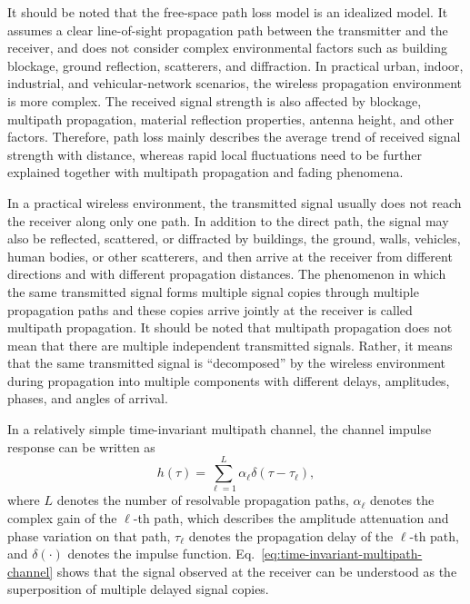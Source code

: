It should be noted that the free-space path loss model is an idealized model.
It assumes a clear line-of-sight propagation path between the transmitter and the receiver,
and does not consider complex environmental factors such as building blockage,
ground reflection,
scatterers,
and diffraction.
In practical urban,
indoor,
industrial,
and vehicular-network scenarios,
the wireless propagation environment is more complex.
The received signal strength is also affected by blockage,
multipath propagation,
material reflection properties,
antenna height,
and other factors.
Therefore,
path loss mainly describes the average trend of received signal strength with distance,
whereas rapid local fluctuations need to be further explained together with multipath propagation
and fading phenomena.


In a practical wireless environment,
the transmitted signal usually does not reach the receiver along only one path.
In addition to the direct path,
the signal may also be reflected,
scattered,
or diffracted by buildings,
the ground,
walls,
vehicles,
human bodies,
or other scatterers,
and then arrive at the receiver from different directions and with different propagation distances.
The phenomenon in which the same transmitted signal forms multiple signal copies through multiple propagation paths
and these copies arrive jointly at the receiver is called multipath propagation.
It should be noted that multipath propagation does not mean that there are multiple independent transmitted signals.
Rather,
it means that the same transmitted signal is ``decomposed'' by the wireless environment during propagation
into multiple components with different delays,
amplitudes,
phases,
and angles of arrival.

In a relatively simple time-invariant multipath channel,
the channel impulse response can be written as
\begin{equation}
    h(\tau)
    =
    \sum_{\ell=1}^{L}
    \alpha_{\ell}
    \delta
    \left(
        \tau-\tau_{\ell}
    \right),
    \label{eq:time-invariant-multipath-channel}
\end{equation}
where
\(L\) denotes the number of resolvable propagation paths,
\(\alpha_{\ell}\) denotes the complex gain of the \(\ell\)-th path,
which describes the amplitude attenuation and phase variation on that path,
\(\tau_{\ell}\) denotes the propagation delay of the \(\ell\)-th path,
and \(\delta(\cdot)\) denotes the impulse function.
Eq.~\eqref{eq:time-invariant-multipath-channel} shows that the signal observed at the receiver
can be understood as the superposition of multiple delayed signal copies.

